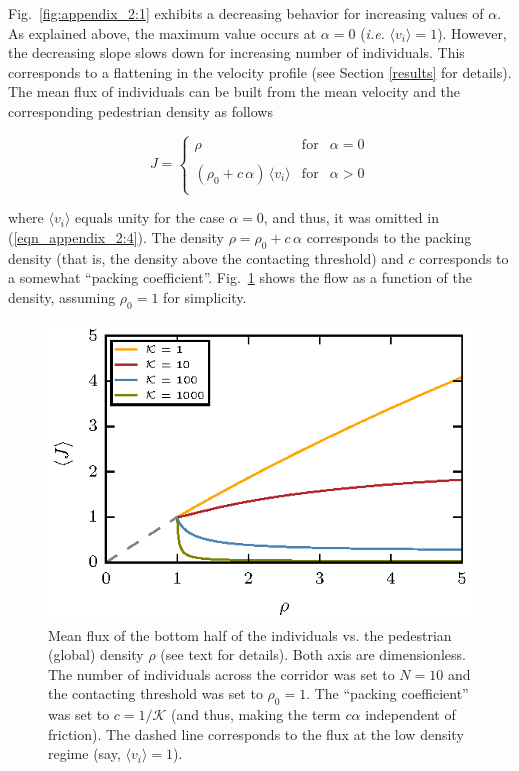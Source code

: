 \documentclass[preprint,12pt]{elsarticle}
\begin{document}
Fig.~\ref{fig:appendix_2:1} exhibits a decreasing behavior for increasing 
values of $\alpha$. As explained above, the maximum value occurs at $\alpha=0$ 
(\textit{i.e.} $\langle v_i\rangle=1$). However, the decreasing slope slows 
down for increasing number of individuals. This corresponds to a flattening in 
the velocity profile (see Section \ref{results} for details).  \\

The mean flux of individuals can be built from the mean velocity and the 
corresponding pedestrian density as follows

\begin{equation}
 J=\left\{\begin{array}{lcl}
          \rho & \mathrm{for} & \alpha=0 \\
          & & \\
          (\rho_0+c\,\alpha)\,\langle v_i\rangle & \mathrm{for}  & 
\alpha>0\\
         \end{array}\right.\label{eqn_appendix_2:4}
\end{equation}

where $\langle v_i\rangle$ equals unity for the case $\alpha=0$, and thus, it 
was omitted in (\ref{eqn_appendix_2:4}). The density $\rho=\rho_0+c\,\alpha$ 
corresponds to the packing density (that is, the density above the contacting 
threshold) and $c$ corresponds to a somewhat ``packing coefficient''. 
Fig.~\ref{fig:appendix_2:2} shows the flow as a function of the density, 
assuming $\rho_0=1$ for simplicity. \\


\begin{figure}[htbp!]
\centering
\includegraphics[width=0.7\columnwidth]
{./fig_flux_model.eps}
\caption{\label{fig:appendix_2:2} Mean flux of the bottom half of the 
individuals vs. the pedestrian (global) density $\rho$ (see text for details). 
Both axis are dimensionless. The number of individuals across the 
corridor was set to $N=10$ and the contacting threshold was set to $\rho_0=1$. 
The ``packing coefficient'' was set to $c=1/\mathcal{K}$ (and thus, making the 
term $c\alpha$ independent of friction). The dashed line corresponds to the 
flux at the low density regime (say, $\langle v_i\rangle=1$).   }
\end{figure}
\end{document}
